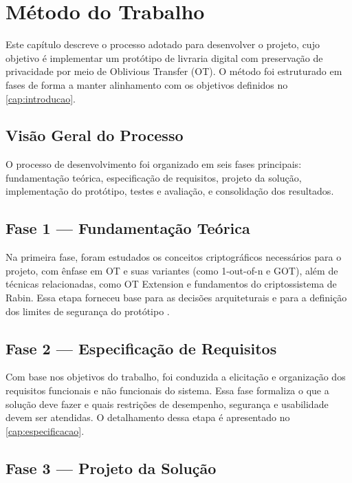 \chapter{Método do Trabalho}\label{cap:metodo}

Este capítulo descreve o processo adotado para desenvolver o projeto, cujo
objetivo é implementar um protótipo de livraria digital com preservação de
privacidade por meio de Oblivious Transfer (OT). O método foi estruturado em
fases de forma a manter alinhamento com os objetivos definidos no \autoref{cap:introducao}.

\section{Visão Geral do Processo}

O processo de desenvolvimento foi organizado em seis fases principais:
fundamentação teórica, especificação de requisitos, projeto da solução,
implementação do protótipo, testes e avaliação, e consolidação dos resultados.

\section{Fase 1 --- Fundamentação Teórica}

Na primeira fase, foram estudados os conceitos criptográficos necessários para
o projeto, com ênfase em OT e suas variantes (como 1-out-of-n e GOT), além de
técnicas relacionadas, como OT Extension e fundamentos do criptossistema de
Rabin. Essa etapa forneceu base para as decisões arquiteturais e para a
definição dos limites de segurança do protótipo \cite{rabin2005, tassa2011}.

\section{Fase 2 --- Especificação de Requisitos}

Com base nos objetivos do trabalho, foi conduzida a elicitação e organização
dos requisitos funcionais e não funcionais do sistema. Essa fase formaliza o
que a solução deve fazer e quais restrições de desempenho, segurança e
usabilidade devem ser atendidas. O detalhamento dessa etapa é apresentado no
\autoref{cap:especificacao}.

\section{Fase 3 --- Projeto da Solução}

